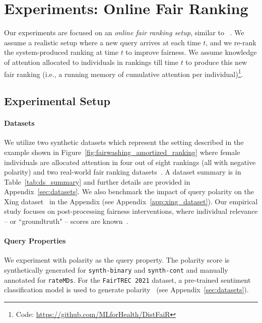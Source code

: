 

\section{Experiments: Online Fair Ranking}  

Our experiments are focused on an \emph{online fair ranking setup}, similar to ~\cite{biega2018equity}. We assume a realistic setup where a new query arrives at each time $t$, and we re-rank the system-produced ranking at time $t$ to improve fairness. We assume knowledge of attention allocated to individuals in rankings till time $t$ to produce this new fair ranking (i.e., a running memory of cumulative attention per individual)\footnote{Code: \url{https://github.com/MLforHealth/DistFaiR}}.  


\subsection{Experimental Setup}
\paragraph{Datasets} We utilize two synthetic datasets which represent the setting described in the example shown in Figure~\ref{fig:fairwashing_amortized_ranking} where female individuals are allocated attention in four out of eight rankings (all with negative polarity) and two real-world fair ranking datasets~\cite{thawani2019online,trec-fair-ranking-2021}. A dataset summary is in Table~\ref{tab:ds_summary} and further details are provided in Appendix~\ref{sec:datasets}. We also benchmark the impact of query polarity on the Xing dataset~\cite{zehlike2017fa} in the Appendix (see Appendix~\ref{app:xing_dataset}).  Our empirical study focuses on post-processing fairness interventions, where individual relevance -- or ``groundtruth" -- scores are known~\cite{gorantla2023sampling}.


\paragraph{Query Properties} We experiment with polarity as the query property. The polarity score is synthetically generated for \texttt{synth-binary} and \texttt{synth-cont} and manually annotated for \texttt{rateMDs}. For the \texttt{FairTREC 2021} dataset, a pre-trained sentiment classification model is used to generate polarity~\cite{barbieri-etal-2020-tweeteval} (see Appendix~\ref{sec:datasets}). 

